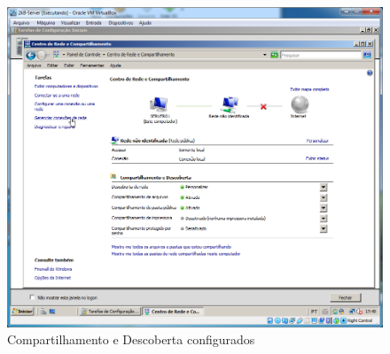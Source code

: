 \documentclass[10pt]{article}
\begin{document}
\begin{figure}[H]
    \centering
    \caption{Compartilhamento e Descoberta configurados}
    \label{fig:4235}
    \includegraphics[width=\linewidth]{images/configuracao_windows/windows_server/030.png}
\end{figure}
\end{document}
